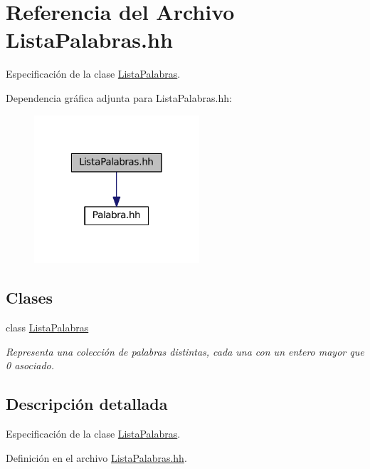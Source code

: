 \hypertarget{_lista_palabras_8hh}{\section{Referencia del Archivo Lista\-Palabras.\-hh}
\label{_lista_palabras_8hh}
}


Especificación de la clase \hyperlink{class_lista_palabras}{Lista\-Palabras}.  


Dependencia gráfica adjunta para Lista\-Palabras.\-hh\-:\nopagebreak
\begin{figure}[H]
\begin{center}
\leavevmode
\includegraphics[width=174pt]{_lista_palabras_8hh__incl}
\end{center}
\end{figure}
\subsection*{Clases}
\begin{DoxyCompactItemize}
\item 
class \hyperlink{class_lista_palabras}{Lista\-Palabras}
\begin{DoxyCompactList}\small\item\em Representa una colección de palabras distintas, cada una con un entero mayor que 0 asociado. \end{DoxyCompactList}\end{DoxyCompactItemize}


\subsection{Descripción detallada}
Especificación de la clase \hyperlink{class_lista_palabras}{Lista\-Palabras}. 

Definición en el archivo \hyperlink{_lista_palabras_8hh_source}{Lista\-Palabras.\-hh}.

